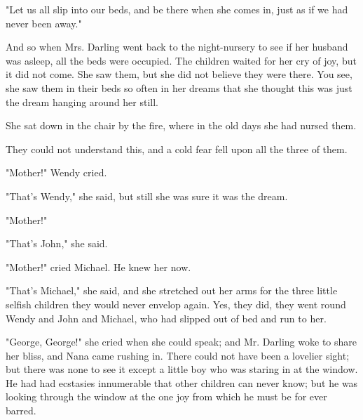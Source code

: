 "Let us all slip into our beds, and be there when she comes in, just as if
we had never been away."


And so when Mrs. Darling went back to the night-nursery to see if her
husband was asleep, all the beds were occupied. The children waited for
her cry of joy, but it did not come. She saw them, but she did not believe
they were there. You see, she saw them in their beds so often in her
dreams that she thought this was just the dream hanging around her still.


She sat down in the chair by the fire, where in the old days she had
nursed them.


They could not understand this, and a cold fear fell upon all the three of
them.


"Mother!" Wendy cried.


"That's Wendy," she said, but still she was sure it was the dream.


"Mother!"


"That's John," she said.


"Mother!" cried Michael. He knew her now.


"That's Michael," she said, and she stretched out her arms for the three
little selfish children they would never envelop again. Yes, they did,
they went round Wendy and John and Michael, who had slipped out of bed and
run to her.


"George, George!" she cried when she could speak; and Mr. Darling woke to
share her bliss, and Nana came rushing in. There could not have been a
lovelier sight; but there was none to see it except a little boy who was
staring in at the window. He had had ecstasies innumerable that other
children can never know; but he was looking through the window at the one
joy from which he must be for ever barred.

